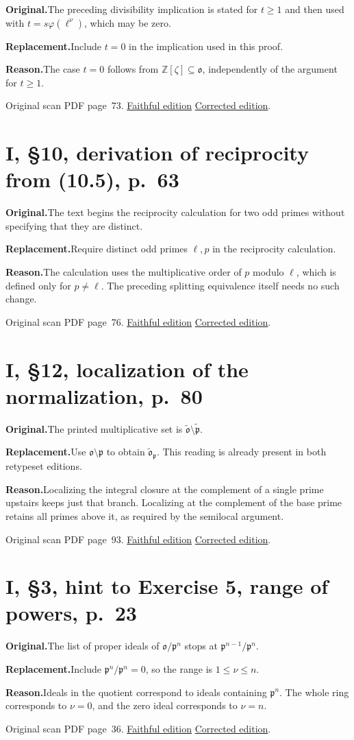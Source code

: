 \documentclass[11pt,a4paper]{article}
\newcommand{\original}{\par\smallskip\noindent\textbf{Original.}\enspace}
\newcommand{\replacement}{\par\smallskip\noindent\textbf{Replacement.}\enspace}
\newcommand{\reason}{\par\smallskip\noindent\textbf{Reason.}\enspace}
\newcommand{\editionlink}[3]{\href{#1\#errata.#2}{#3}}
\newcommand{\location}[2]{%
  \par\smallskip\noindent Original scan PDF page~#2.\enspace
  \editionlink{Neukirch_Faithful.pdf}{#1}{Faithful edition}
  \quad\editionlink{Neukirch_Corrected.pdf}{#1}{Corrected edition}.}
\begin{document}
\original The preceding divisibility implication is stated for $t\ge1$ and then used with $t=s\varphi(\ell^\nu)$, which may be zero.
\replacement Include $t=0$ in the implication used in this proof.
\reason The case $t=0$ follows from $\mathbb Z[\zeta]\subseteq\mathfrak o$, independently of the argument for $t\ge1$.
\location{57}{73}

\setcounter{section}{57}
\section{I, \S10, derivation of reciprocity from (10.5), p.~63}\label{errata:item:58}

\original The text begins the reciprocity calculation for two odd primes without specifying that they are distinct.
\replacement Require distinct odd primes $\ell,p$ in the reciprocity calculation.
\reason The calculation uses the multiplicative order of $p$ modulo $\ell$, which is defined only for $p\ne\ell$. The preceding splitting equivalence itself needs no such change.
\location{58}{76}

\setcounter{section}{58}
\section{I, \S12, localization of the normalization, p.~80}\label{errata:item:59}

\original The printed multiplicative set is $\widetilde{\mathfrak o}\setminus\widetilde{\mathfrak p}$.
\replacement Use $\mathfrak o\setminus\mathfrak p$ to obtain $\widetilde{\mathfrak o}_{\mathfrak p}$. This reading is already present in both retypeset editions.
\reason Localizing the integral closure at the complement of a single prime upstairs keeps just that branch. Localizing at the complement of the base prime retains all primes above it, as required by the semilocal argument.
\location{59}{93}

\setcounter{section}{59}
\section{I, \S3, hint to Exercise 5, range of powers, p.~23}\label{errata:item:60}

\original The list of proper ideals of $\mathfrak o/\mathfrak p^n$ stops at $\mathfrak p^{n-1}/\mathfrak p^n$.
\replacement Include $\mathfrak p^n/\mathfrak p^n=0$, so the range is $1\le\nu\le n$.
\reason Ideals in the quotient correspond to ideals containing $\mathfrak p^n$. The whole ring corresponds to $\nu=0$, and the zero ideal corresponds to $\nu=n$.
\location{60}{36}
\end{document}
